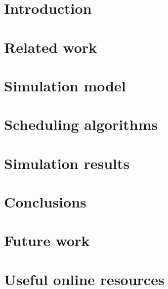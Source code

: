 \documentclass[en]{pracamgr}
\begin{document}
\tableofcontents

\chapter*{Introduction} \label{ch:intro}


\chapter{Related work} \label{ch:related-work}


\chapter{Simulation model} \label{ch:simulation-model}


\chapter{Scheduling algorithms} \label{ch:algorithms}


\chapter{Simulation results} \label{ch:results}


\chapter{Conclusions} \label{ch:conclusion}


\chapter{Future work} \label{ch:future-work}


\appendix
\chapter{Useful online resources} \label{ch:online}


\printbibliography[
heading=bibintoc,
]
\end{document}
